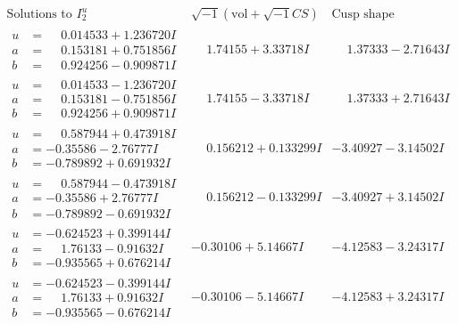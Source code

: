 \documentclass[1p]{elsarticle_modified}
\theoremstyle{definition}
\newcommand{\I}{\sqrt{-1}}
\begin{document}
$$\begin{array}{c|c|c}  
\text{Solutions to }I^u_{2}& \I (\text{vol} + \sqrt{-1}CS) & \text{Cusp shape}\\
 \hline 
\begin{aligned}
u &= \phantom{-}0.014533 + 1.236720 I \\
a &= \phantom{-}0.153181 + 0.751856 I \\
b &= \phantom{-}0.924256 - 0.909871 I\end{aligned}
 & \phantom{-}1.74155 + 3.33718 I & \phantom{-}1.37333 - 2.71643 I \\ \hline\begin{aligned}
u &= \phantom{-}0.014533 - 1.236720 I \\
a &= \phantom{-}0.153181 - 0.751856 I \\
b &= \phantom{-}0.924256 + 0.909871 I\end{aligned}
 & \phantom{-}1.74155 - 3.33718 I & \phantom{-}1.37333 + 2.71643 I \\ \hline\begin{aligned}
u &= \phantom{-}0.587944 + 0.473918 I \\
a &= -0.35586 - 2.76777 I \\
b &= -0.789892 + 0.691932 I\end{aligned}
 & \phantom{-}0.156212 + 0.133299 I & -3.40927 - 3.14502 I \\ \hline\begin{aligned}
u &= \phantom{-}0.587944 - 0.473918 I \\
a &= -0.35586 + 2.76777 I \\
b &= -0.789892 - 0.691932 I\end{aligned}
 & \phantom{-}0.156212 - 0.133299 I & -3.40927 + 3.14502 I \\ \hline\begin{aligned}
u &= -0.624523 + 0.399144 I \\
a &= \phantom{-}1.76133 - 0.91632 I \\
b &= -0.935565 + 0.676214 I\end{aligned}
 & -0.30106 + 5.14667 I & -4.12583 - 3.24317 I \\ \hline\begin{aligned}
u &= -0.624523 - 0.399144 I \\
a &= \phantom{-}1.76133 + 0.91632 I \\
b &= -0.935565 - 0.676214 I\end{aligned}
 & -0.30106 - 5.14667 I & -4.12583 + 3.24317 I \\ \hline\begin{aligned}

\end{aligned}
\end{array}$$
\end{document}

